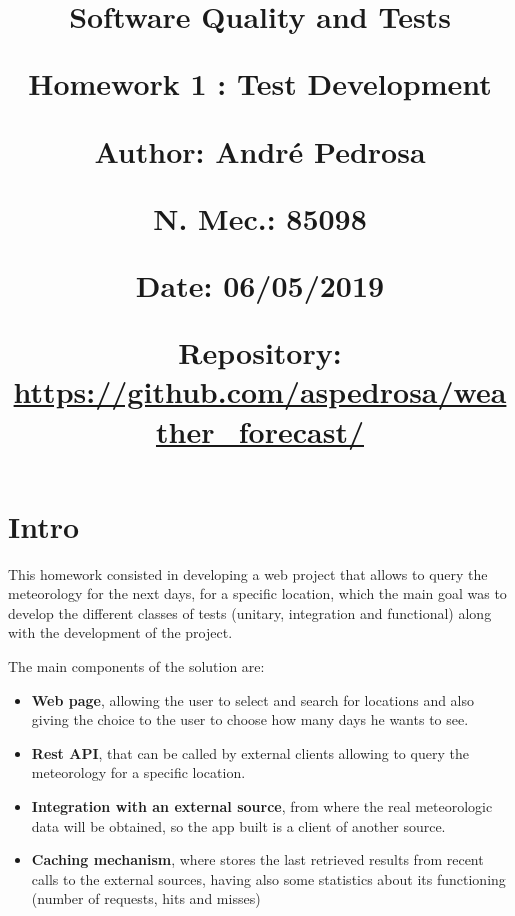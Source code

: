 \documentclass[12pt]{article}
\begin{document}
\title{\vspace{-0.9cm}
       \Large\raggedright\textbf{Software Quality and Tests} \\ 
       \large\raggedright\textbf{Homework 1 : Test Development} \\ 
       \vspace{0.5cm}
       \normalsize
       \raggedright\textbf{Author: \hspace{1.1cm} André Pedrosa} \\ \vspace{0.1cm}
       \raggedright\textbf{N. Mec.: \hspace{0.92cm} 85098} \\ \vspace{0.1cm}
       \raggedright\textbf{Date: \hspace{1.6cm} 06/05/2019} \\ \vspace{0.1cm}
       \raggedright\textbf{Repository: \hspace{0.35cm} \url{https://github.com/aspedrosa/weather\_forecast/}} \\}
\date{} %

\maketitle
\thispagestyle{fancy}

\vspace{-1.4cm}

\tableofcontents

\newpage

\section{Intro}

This homework consisted in developing a web project that allows to query the
  meteorology for the next days, for a specific location, which the main goal
  was to develop the different classes of tests (unitary, integration and functional)
  along with the development of the project.

The main components of the solution are:
\begin{itemize}
  \item \textbf{Web page}, allowing the user to select and search for locations and also giving
    the choice to the user to choose how many days he wants to see.
  \item \textbf{Rest API}, that can be called by external clients allowing to query the
    meteorology for a specific location.
  \item \textbf{Integration with an external source}, from where the real meteorologic data will be
    obtained, so the app built is a client of another source.
  \item \textbf{Caching mechanism}, where stores the last retrieved results from recent calls to the
    external sources, having also some statistics about its functioning (number of requests,
    hits and misses)
\end{itemize}
\end{document}
